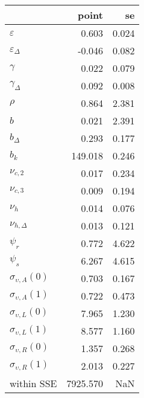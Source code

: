 \begin{tabular}{lrr}
\toprule
{} &     point &     se \\
\midrule
$\varepsilon$            &     0.603 &  0.024 \\
$\varepsilon_{\Delta}$   &    -0.046 &  0.082 \\
$\gamma$                 &     0.022 &  0.079 \\
$\gamma_{\Delta}$        &     0.092 &  0.008 \\
$\rho$                   &     0.864 &  2.381 \\
$b$                      &     0.021 &  2.391 \\
$b_{\Delta}$             &     0.293 &  0.177 \\
$b_k$                    &   149.018 &  0.246 \\
$\nu_{c,2}$              &     0.017 &  0.234 \\
$\nu_{c,3}$              &     0.009 &  0.194 \\
$\nu_{h}$                &     0.014 &  0.076 \\
$\nu_{h,\Delta}$         &     0.013 &  0.121 \\
$\psi_{r}$               &     0.772 &  4.622 \\
$\psi_{s}$               &     6.267 &  4.615 \\
$\sigma_{\upsilon,A}(0)$ &     0.703 &  0.167 \\
$\sigma_{\upsilon,A}(1)$ &     0.722 &  0.473 \\
$\sigma_{\upsilon,L}(0)$ &     7.965 &  1.230 \\
$\sigma_{\upsilon,L}(1)$ &     8.577 &  1.160 \\
$\sigma_{\upsilon,R}(0)$ &     1.357 &  0.268 \\
$\sigma_{\upsilon,R}(1)$ &     2.013 &  0.227 \\
within SSE               &  7925.570 &    NaN \\
\bottomrule
\end{tabular}
